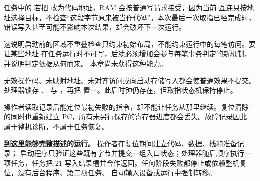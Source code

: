 任务中的  若把  改为代码地址，RAM 会按普通写请求接受，因为当前
互连只按地址选择目标，不检查“这段字节原来被当作代码”。本次最后一次取指已经完成时，
错误写入甚至可能不影响本次结果，却会破坏下一次运行。

这说明启动前的区域不重叠检查只约束初始布局，不能约束运行中的每笔访问。要让某些地址
在任务运行时不可写，后续必须增加会参与每笔事务判定的新机制，并说明判定依据从何而来。
本章尚未获得这种能力。


无效操作码、未映射地址、未对齐访问或向启动存储写入都会使普通效果不提交。处理器锁存
、 与 ，再把
 置一。此后时钟仍存在，但取指状态机保持停止。

操作者读取记录后能定位最初失败的指令，却不能让任务从那里继续。复位清除
 的同时也重新建立 PC，所有未另行保存的寄存器进度都会丢失。故障记录因此
属于整机诊断，不属于任务恢复。

\begin{problemframe}
\textbf{到这里能够完整描述的运行。} 操作者在复位期间建立代码、数据、栈和准备记录；
启动程序只验证这些既有字节并提交一组入口状态；处理器随后顺序执行一项任务，任务把 21
写入结果槽并合作返回。任何阶段失败都停止或依赖整机复位，没有后台程序、第二项任务、
自动输入设备或运行中强制转移。
\end{problemframe}
